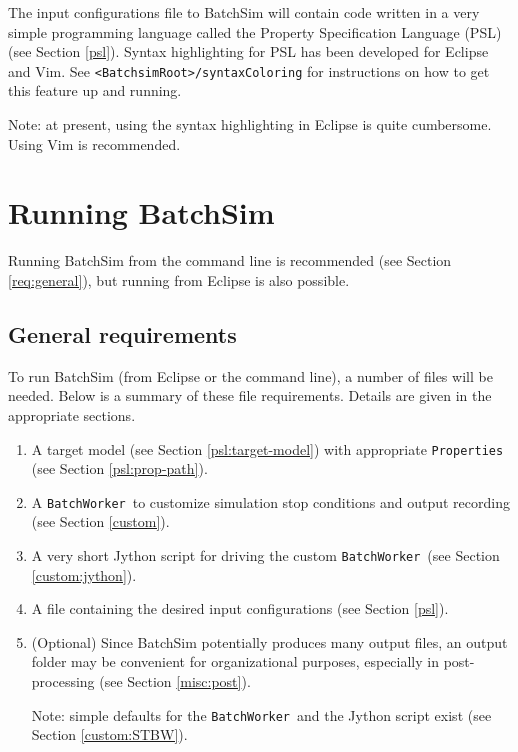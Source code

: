 \documentclass{article}
\newcommand{\BS}{<BatchsimRoot>}
\newcommand{\BW}{{\tt BatchWorker}}
\begin{document}
The input configurations file to BatchSim will contain code written in a very simple programming language called the Property Specification Language (PSL) (see Section \ref{psl}). Syntax highlighting for PSL has been developed for Eclipse and Vim. See {\tt \BS/syntaxColoring} for instructions on how to get this feature up and running.

\begin{sideblock}
Note: at present, using the syntax highlighting in Eclipse is quite cumbersome. Using Vim is recommended.
\end{sideblock}

\section{Running BatchSim}

Running BatchSim from the command line is recommended (see Section \ref{req:general}), but running from Eclipse is also possible.

\subsection{General requirements}

To run BatchSim (from Eclipse or the command line), a number of files will be needed. Below is a summary of these file requirements. Details are given in the appropriate sections.

\begin{enumerate}

\item A target model (see Section \ref{psl:target-model}) with appropriate {\tt Properties} (see Section \ref{psl:prop-path}).

\item A \BW\ to customize simulation stop conditions and output recording (see Section \ref{custom}).

\item A very short Jython script for driving the custom \BW\ (see Section \ref{custom:jython}).

\item A file containing the desired input configurations (see Section \ref{psl}).

\item (Optional) Since BatchSim potentially produces many output files, an output folder may be convenient for organizational purposes, especially in post-processing (see Section \ref{misc:post}).

\begin{sideblock}
Note: simple defaults for the \BW\ and the Jython script exist (see Section \ref{custom:STBW}).
\end{sideblock}

\end{enumerate}
\end{document}
